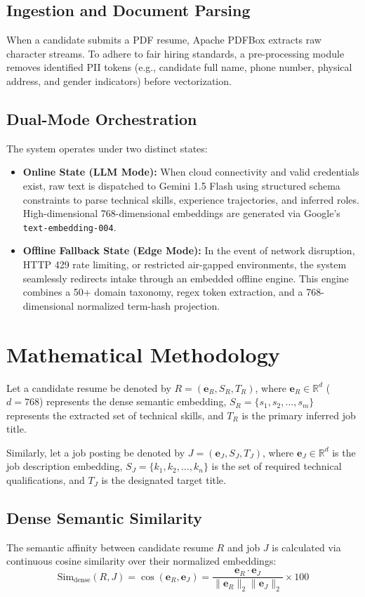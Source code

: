 \documentclass[conference]{IEEEtran}
\begin{document}
\subsection{Ingestion and Document Parsing}
When a candidate submits a PDF resume, Apache PDFBox extracts raw character streams. To adhere to fair hiring standards, a pre-processing module removes identified PII tokens (e.g., candidate full name, phone number, physical address, and gender indicators) before vectorization.

\subsection{Dual-Mode Orchestration}
The system operates under two distinct states:
\begin{itemize}
    \item \textbf{Online State (LLM Mode):} When cloud connectivity and valid credentials exist, raw text is dispatched to Gemini 1.5 Flash using structured schema constraints to parse technical skills, experience trajectories, and inferred roles. High-dimensional 768-dimensional embeddings are generated via Google's \texttt{text-embedding-004}.
    \item \textbf{Offline Fallback State (Edge Mode):} In the event of network disruption, HTTP 429 rate limiting, or restricted air-gapped environments, the system seamlessly redirects intake through an embedded offline engine. This engine combines a 50+ domain taxonomy, regex token extraction, and a 768-dimensional normalized term-hash projection.
\end{itemize}

\section{Mathematical Methodology}
Let a candidate resume be denoted by $R = (\mathbf{e}_R, S_R, T_R)$, where $\mathbf{e}_R \in \mathbb{R}^{d}$ ($d = 768$) represents the dense semantic embedding, $S_R = \{s_1, s_2, \dots, s_m\}$ represents the extracted set of technical skills, and $T_R$ is the primary inferred job title. 

Similarly, let a job posting be denoted by $J = (\mathbf{e}_J, S_J, T_J)$, where $\mathbf{e}_J \in \mathbb{R}^{d}$ is the job description embedding, $S_J = \{k_1, k_2, \dots, k_n\}$ is the set of required technical qualifications, and $T_J$ is the designated target title.

\subsection{Dense Semantic Similarity}
The semantic affinity between candidate resume $R$ and job $J$ is calculated via continuous cosine similarity over their normalized embeddings:
\begin{equation}
\text{Sim}_{\text{dense}}(R, J) = \cos(\mathbf{e}_R, \mathbf{e}_J) = \frac{\mathbf{e}_R \cdot \mathbf{e}_J}{\|\mathbf{e}_R\|_2 \|\mathbf{e}_J\|_2} \times 100
\end{equation}
\end{document}
